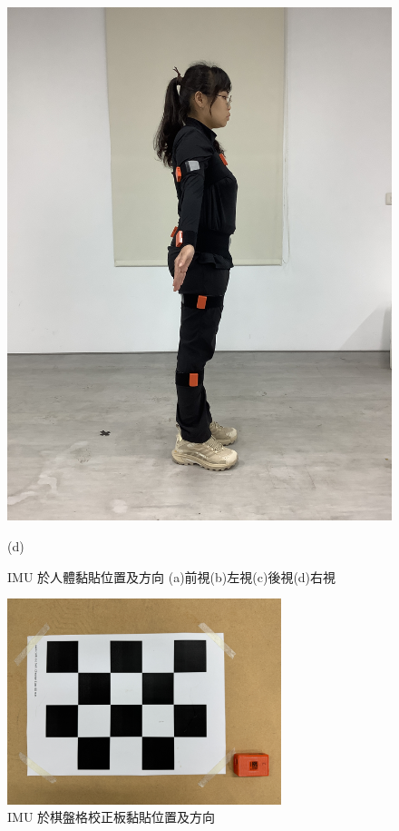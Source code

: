 \begin{figure}[!ht]
\begin{minipage}{.25\textwidth}
     \includegraphics[width=\linewidth, angle=-90]{figure/ch3_fig_rightimu.JPG}
     \caption*{(d)}
   \end{minipage}
   \caption[IMU 於人體黏貼位置及方向 (a)前視(b)左視(c)後視(d)右視]{IMU 於人體黏貼位置及方向 (a)前視(b)左視(c)後視(d)右視}
   \label{ch3_fig_humanimu}
\end{figure}

\begin{figure}[!ht]
   \centering
   \includegraphics[width=8cm]{figure/ch3_fig_cbimu.JPG}
    \caption[IMU 於棋盤格校正板黏貼位置及方向]{IMU 於棋盤格校正板黏貼位置及方向}
    \label{ch3_fig_cbimu}
\end{figure}

